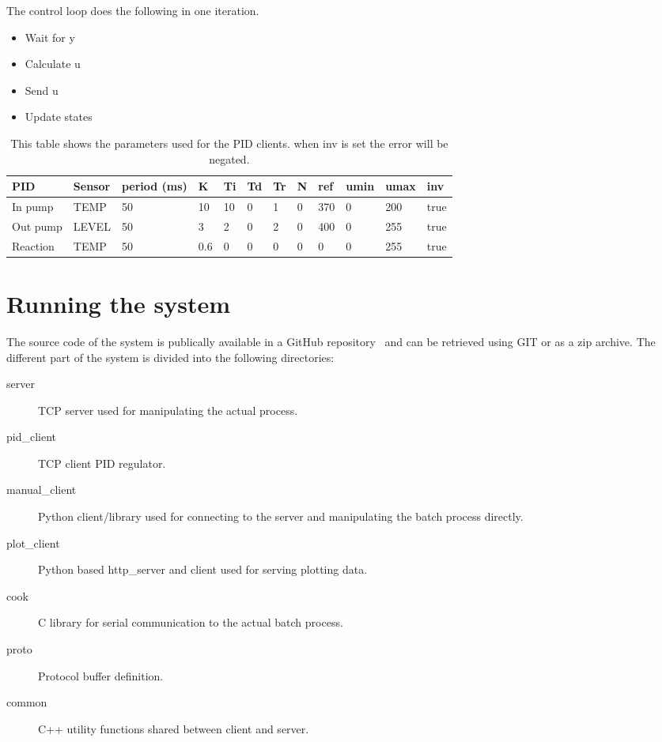 \documentclass{article}
\begin{document}
The control loop does the following in one iteration.
\begin{itemize}
\item{Wait for y}
\item{Calculate u}
\item{Send u}
\item{Update states}
\end{itemize}

\begin{table}[h]
\begin{tabular}{|l|l|l|l|l|l|l|l|l|l|l|l|}
\hline
PID      & Sensor & period (ms) & K & Ti & Td & Tr & N & ref & umin & umax & inv \\
\hline
In pump  & TEMP & 50 & 10 & 10 & 0 & 1 & 0 & 370 & 0 & 200 & true \\
\hline
Out pump & LEVEL & 50 & 3 & 2 & 0 & 2 & 0 & 400 & 0 & 255 & true \\
\hline
Reaction & TEMP & 50 & 0.6 & 0 & 0 & 0 & 0 & 0 & 0 & 255 & true \\
\hline
\end{tabular}
\caption{\small{This table shows the parameters used for the PID clients.
		 when inv is set the error will be negated.}}
\label{paramtable}
\end{table}

\section{Running the system}
The source code of the system is publically available in a GitHub
repository~\cite{repo} and can be retrieved using GIT or as a zip archive.
The different part of the system is divided into the following directories:
\begin{description}
\item[server]
  TCP server used for manipulating the actual process.
\item[pid\_client]
  TCP client PID regulator.
\item[manual\_client]
  Python client/library used for connecting to the server and manipulating the
  batch process directly.
\item[plot\_client]
  Python based http\_server and client used for serving plotting data.
\item[cook]
  C library for serial communication to the actual batch process.
\item[proto]
  Protocol buffer definition.
\item[common]
  C++ utility functions shared between client and server.
\end{description}
\end{document}
